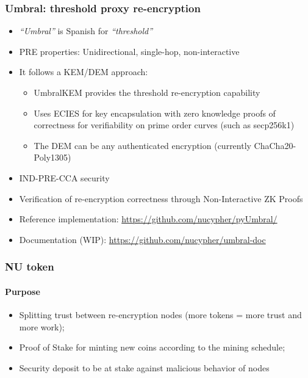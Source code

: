 \documentclass[xetex,mathsans,sans,aspectratio=169]{beamer}
\begin{document}
    \begin{frame}
        \frametitle{Umbral: threshold proxy re-encryption}
        \begin{itemize}
        	\item \emph{``Umbral''} is Spanish for \emph{``threshold''}
            \item PRE properties: Unidirectional, single-hop, non-interactive
            \item It follows a KEM/DEM approach:
            	\begin{itemize}
					\item UmbralKEM provides the threshold re-encryption capability
                    \item Uses ECIES for key encapsulation with zero knowledge proofs of correctness for verifiability on prime order curves (such as secp256k1)
            		\item The DEM can be any authenticated encryption (currently ChaCha20-Poly1305)
        		\end{itemize}
			\item IND-PRE-CCA security
			\item Verification of re-encryption correctness through Non-Interactive ZK Proofs
			\item Reference implementation: \url{https://github.com/nucypher/pyUmbral/}
			\item Documentation (WIP): \url{https://github.com/nucypher/umbral-doc}
        \end{itemize}
    \end{frame}

    \begin{frame}
        \frametitle{NU token}
        \framesubtitle{Purpose}
        \begin{itemize}
            \item Splitting trust between re-encryption nodes (more tokens = more trust and more work);
            \item Proof of Stake for minting new coins according to the mining schedule;
            \item Security deposit to be at stake against malicious behavior of nodes
        \end{itemize}
    \end{frame}
\end{document}
